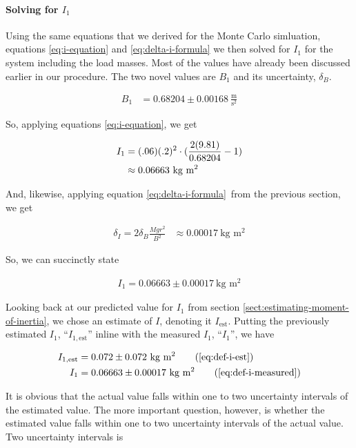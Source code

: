 \documentclass[coverpage]{article}
\newcommand{\iUnit}{\text{kg $\text{m}^2$}}
\newcommand{\mpssq}{\frac{\text{m}}{\text{s}^2}}
\begin{document}
	\paragraph{Solving for $I_1$}
	
	Using the same equations that we derived for the Monte Carlo simluation, equations \ref{eq:i-equation} and \ref{eq:delta-i-formula} we then solved for $I_1$ for the system including the load masses. Most of the values have already been discussed earlier in our procedure. The two novel values are $B_1$ and its uncertainty, $\delta_B$.
	
	\begin{align}
		B_1 &= 0.68204 \pm 0.00168\ \mpssq \label{eq:def-b1}
	\end{align}

	So, applying equations \ref{eq:i-equation}, we get
	
	\begin{align}
		I_1 &= (.06)(.2)^2 \cdot (\frac{2(9.81)}{0.68204} - 1) \notag \\
		&\approx 0.06663\ \iUnit
	\end{align}
	
	And, likewise, applying equation \ref{eq:delta-i-formula}~from the previous section, we get
	
	\begin{align}
		\delta_I = 2 \delta_B \frac{M g r^2}{B^2}
		&\approx 0.00017\ \iUnit
	\end{align}
	
	So, we can succinctly state
	
	\begin{align}
		I_1 = 0.06663 \pm 0.00017\ \iUnit \label{eq:def-i-measured}
	\end{align}

	Looking back at our predicted value for $I_1$ from section \ref{sect:estimating-moment-of-inertia}, we chose an estimate of $I$, denoting it $I_{\text{est}}$. Putting the previously estimated $I_1$, ``$I_{1, \text{est}}$'' inline with the measured $I_1$, ``$I_1$'', we have
		
	\begin{align}
		I_{1, \text{est}} &= 0.072 \pm 0.072\ \iUnit \tag{\ref{eq:def-i-est}} \\
		I_1 &= 0.06663 \pm 0.00017\ \iUnit \tag{\ref{eq:def-i-measured}}
	\end{align}

	It is obvious that the actual value falls within one to two uncertainty intervals of the estimated value. The more important question, however, is whether the estimated value falls within one to two uncertainty intervals of the actual value. Two uncertainty intervals is
	
\end{document}
